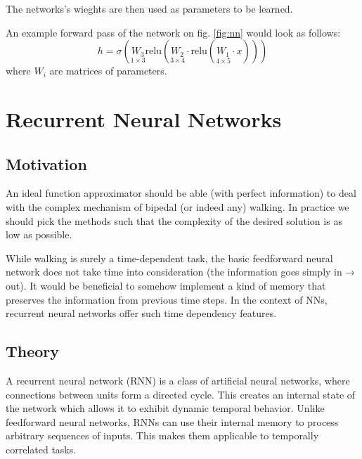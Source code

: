 The networks's wieghts are then used as parameters to be learned.

An example forward pass of the network on fig. \ref{fig:nn} would look as follows:
\[
h=\sigma\left(\underset{1\times 3}{W_3}\text{relu} \left(\underset{3\times 4}{W_2}\cdot\text{relu} \left(\underset{4\times 5}{W_1}\cdot x\right)\right)\right)
\]
where $W_i$ are matrices of parameters.

\newpage
\section{Recurrent Neural Networks}

\subsection{Motivation}
An ideal function approximator should be able (with perfect information) to deal with the complex mechanism of bipedal (or indeed any) walking. In practice we should pick the methods such that the complexity of the desired solution is as low as possible.

While walking is surely a time-dependent task, the basic feedforward neural network does not take time into consideration (the information goes simply in$\to$out). 
It would be beneficial to somehow implement a kind of memory that preserves the information from previous time steps. In the context of NNs, recurrent neural networks offer such time dependency features.

\subsection{Theory}
A recurrent neural network (RNN) is a class of artificial neural networks, where connections between units form a directed cycle. This creates an internal state of the network which allows it to exhibit dynamic temporal behavior. Unlike feedforward neural networks, RNNs can use their internal memory to process arbitrary sequences of inputs. This makes them applicable to temporally correlated tasks.


